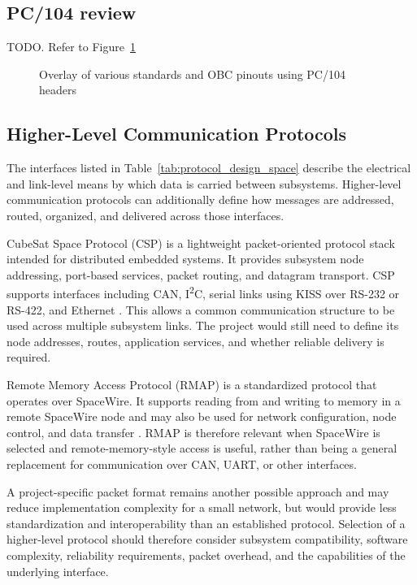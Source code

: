 \documentclass[10pt]{../datasheet}
\let\cite\citep
\begin{document}
\subsection*{PC/104 review}


TODO. Refer to Figure~\ref{fig:pc104_header_schematic}

\begin{figure}[htbp]
  \centering
  \caption{Overlay of various standards and OBC pinouts using PC/104 headers}
  \label{fig:pc104_header_schematic}
\end{figure}

\subsection*{Higher-Level Communication Protocols}

The interfaces listed in Table~\ref{tab:protocol_design_space} describe the
electrical and link-level means by which data is carried between subsystems.
Higher-level communication protocols can additionally define how messages are
addressed, routed, organized, and delivered across those interfaces.

CubeSat Space Protocol (CSP) is a lightweight packet-oriented protocol stack
intended for distributed embedded systems. It provides subsystem node
addressing, port-based services, packet routing, and datagram transport. CSP
supports interfaces including CAN, I\textsuperscript{2}C, serial links using
KISS over RS-232 or RS-422, and Ethernet
\cite{libcsp_basics,libcsp_protocol_stack}. This allows a common communication
structure to be used across multiple subsystem links. The project would still
need to define its node addresses, routes, application services, and whether
reliable delivery is required.

Remote Memory Access Protocol (RMAP) is a standardized protocol that operates
over SpaceWire. It supports reading from and writing to memory in a remote
SpaceWire node and may also be used for network configuration, node control,
and data transfer \cite{ecss_rmap_std}. RMAP is therefore relevant when
SpaceWire is selected and remote-memory-style access is useful, rather than
being a general replacement for communication over CAN, UART, or other
interfaces.

A project-specific packet format remains another possible approach and may
reduce implementation complexity for a small network, but would provide less
standardization and interoperability than an established protocol. Selection
of a higher-level protocol should therefore consider subsystem compatibility,
software complexity, reliability requirements, packet overhead, and the
capabilities of the underlying interface.
\end{document}
